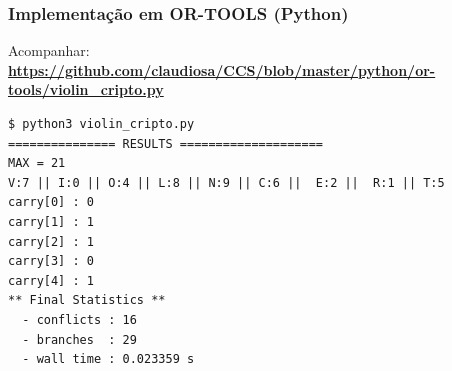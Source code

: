\documentclass{beamer}
\begin{document}
\begin{frame}[fragile] 

\frametitle{Implementação em OR-TOOLS (Python)}

Acompanhar: \\
{\bf \textcolor{magenta}{ \url{https://github.com/claudiosa/CCS/blob/master/python/or-tools/violin_cripto.py}}}
{\small
\begin{verbatim}
$ python3 violin_cripto.py 
=============== RESULTS ====================
MAX = 21
V:7 || I:0 || O:4 || L:8 || N:9 || C:6 ||  E:2 ||  R:1 || T:5
carry[0] : 0 
carry[1] : 1 
carry[2] : 1 
carry[3] : 0 
carry[4] : 1 
** Final Statistics **
  - conflicts : 16
  - branches  : 29
  - wall time : 0.023359 s
\end{verbatim}
}
\end{frame}
\end{document}

